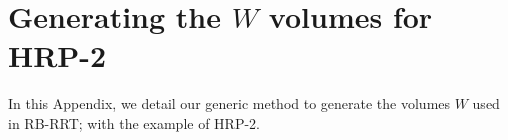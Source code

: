 \section{Generating the $W$ volumes for HRP-2}
\label{app:rom}

In this Appendix,
we detail our generic method to generate the volumes $W$ used
in RB-RRT; with the example of HRP-2.


